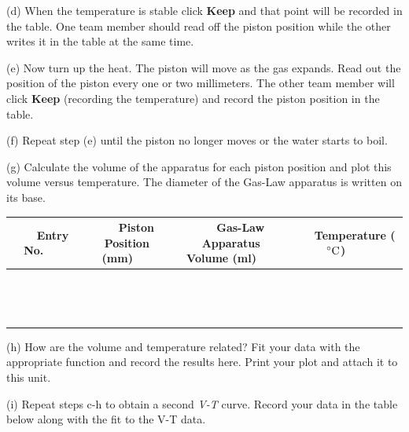 (d) When the temperature is stable click {\bf Keep} and that point will be recorded in the
table. One team member should read off the piston position while the other 
writes it in the table at the same time.

(e) Now turn up the heat. The piston will move as the gas expands.
Read out the position of the piston every one or two millimeters. The other team member
will click {\bf Keep} (recording the temperature) and record the piston position
in the table.

(f) Repeat step (e) until the piston no longer moves or the water starts to boil.
 
(g) Calculate the volume of the apparatus for each piston position and plot
this volume versus temperature. The diameter of the Gas-Law apparatus is written on its
base.

\vspace{0.3cm}
{\centering \begin{tabular}{|c|c|c|c|}
\hline 
~~~Entry No.~~~&
~~~Piston Position (mm)~~~&
~~~Gas-Law Apparatus Volume (ml)~~~&
~~~Temperature ($^\circ  \rm C$)~~~\\
\hline
\hline 
&
&
&
\\
\hline 
&
&
&
\\
\hline 
&
&
&
\\
\hline 
&
&
&
\\
\hline 
&
&
&
\\
\hline 
&
&
&
\\
\hline 
&
&
&
\\
\hline 
&
&
&
\\
\hline 
&
&
&
\\
\hline
&
&
&
\\
\hline
&
&
&
\\
\hline
&
&
&
\\
\hline
&
&
&
\\
\hline
&
&
&
\\
\hline
\end{tabular}\par}
\vspace{0.3cm}

(h) How are the volume and temperature related?
Fit your data with the appropriate function and record the results here.
Print your plot and attach it to this unit.
\vspace{15mm}

\pagebreak[2]
(i) Repeat steps c-h to obtain a second {\it V-T} curve. Record your data in the table below
along with the fit to the V-T data.
\vspace{30mm}


